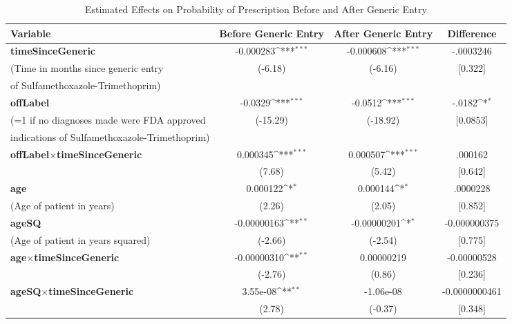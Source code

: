 \begin{table}[htbp]\centering
\def\sym#1{\ifmmode^{#1}\else\(^{#1}\)\fi}
\caption{Estimated Effects on Probability of Prescription Before and After Generic Entry\label{tab1}}
\begin{tabular}{l*{3}{c}}
\hline\hline
Variable            &\multicolumn{1}{c}{Before Generic Entry}&\multicolumn{1}{c}{After Generic Entry}&\multicolumn{1}{c}{Difference}\\
\hline
\textbf{timeSinceGeneric}&   -0.000283\sym{***}&   -0.000608\sym{***}&   -.0003246\\
(Time in months since generic entry            &     (-6.18)         &     (-6.16)         &     [0.322]         \\
of Sulfamethoxazole-Trimethoprim)\\
[1em]
\textbf{offLabel}    &     -0.0329\sym{***}&     -0.0512\sym{***}&   -.0182\sym{*}\\
(=1 if no diagnoses made were FDA approved            &    (-15.29)         &    (-18.92)         &    [0.0853]         \\
indications of Sulfamethoxazole-Trimethoprim)\\
[1em]
\textbf{offLabel}$\times$\textbf{timeSinceGeneric} &    0.000345\sym{***}&    0.000507\sym{***}&   .000162\\
            &      (7.68)         &      (5.42)         &    [0.642]         \\
[1em]
\textbf{age}         &    0.000122\sym{*}  &    0.000144\sym{*}  &   .0000228\\
(Age of patient in years)            &      (2.26)         &      (2.05)         &    [0.852]         \\
[1em]
\textbf{ageSQ}       & -0.00000163\sym{**} & -0.00000201\sym{*}  &   -0.000000375\\
(Age of patient in years squared)            &     (-2.66)         &     (-2.54)         &    [0.775]         \\
[1em]
\textbf{age}$\times$\textbf{timeSinceGeneric}      & -0.00000310\sym{**} &  0.00000219         &   -0.00000528\\
            &     (-2.76)         &      (0.86)         &    [0.236]         \\
[1em]
\textbf{ageSQ}$\times$\textbf{timeSinceGeneric}    &    3.55e-08\sym{**} &   -1.06e-08         &   -0.0000000461\\
            &      (2.78)         &     (-0.37)         &    [0.348]         \\

\end{tabular}
\end{table}
